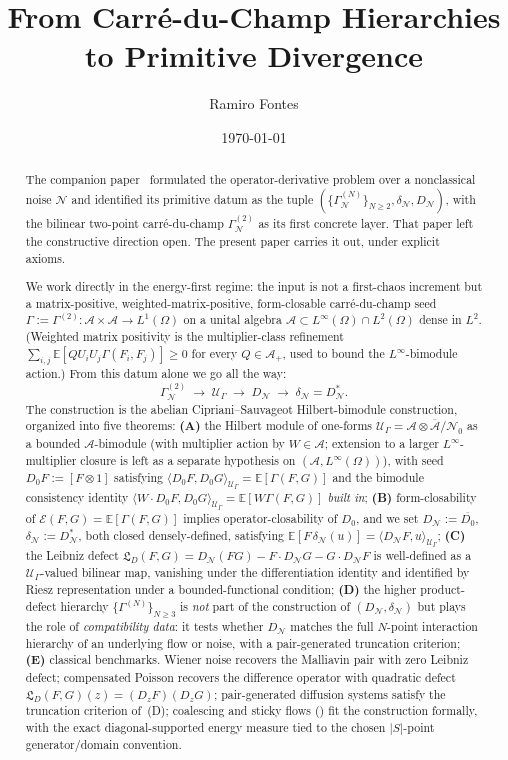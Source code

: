 \documentclass[11pt,reqno]{amsart}
\title{From Carr\'e-du-Champ Hierarchies to Primitive Divergence}
\author{Ramiro Fontes}
\date{\today}
\theoremstyle{plain}
\theoremstyle{definition}
\theoremstyle{remark}
\newcommand{\E}{\mathbb{E}}
\newcommand{\cA}{\mathcal A}
\newcommand{\cE}{\mathcal E}
\newcommand{\cN}{\mathcal N}
\newcommand{\cU}{\mathcal U}
\newcommand{\dN}{D_{\cN}}
\newcommand{\divN}{\delta_{\cN}}
\newcommand{\Lleib}{\mathfrak L}
\begin{document}
\begin{abstract}
The companion paper~\cite{PrimitiveDivergence} formulated the
operator-derivative problem over a nonclassical noise $\cN$ and
identified its primitive datum as the tuple
$(\{\Gamma_{\cN}^{(N)}\}_{N\ge 2},\divN,\dN)$, with the bilinear
two-point carr\'e-du-champ $\Gamma_{\cN}^{(2)}$ as its first concrete
layer. That paper left the constructive direction open. The present
paper carries it out, under explicit axioms.

We work directly in the energy-first regime: the input is not
a first-chaos increment but a matrix-positive, weighted-matrix-positive,
form-closable carr\'e-du-champ seed
$\Gamma:=\Gamma^{(2)}\colon\cA\times\cA\to L^{1}(\Omega)$ on a
unital algebra $\cA\subset L^{\infty}(\Omega)\cap L^{2}(\Omega)$
dense in $L^{2}$. (Weighted matrix positivity is the
multiplier-class refinement
$\sum_{i,j}\E[Q U_{i}U_{j}\Gamma(F_{i},F_{j})]\ge 0$ for every
$Q\in\cA_{+}$, used to bound the $L^{\infty}$-bimodule action.)
From this datum alone we go all the way:
\[
  \Gamma^{(2)}_{\cN}
  \;\longrightarrow\;
  \cU_{\Gamma}
  \;\longrightarrow\;
  \dN
  \;\longrightarrow\;
  \divN=\dN^{*}.
\]
The construction is the abelian Cipriani--Sauvageot
Hilbert-bimodule construction, organized into five theorems:
\textbf{(A)} the Hilbert module of one-forms
$\cU_{\Gamma}=\overline{\cA\otimes\cA/\mathcal N_{0}}$ as a
bounded $\cA$-bimodule (with multiplier action by $W\in\cA$;
extension to a larger $L^{\infty}$-multiplier closure is left
as a separate hypothesis on $(\cA,L^{\infty}(\Omega))$), with
seed $D_{0}F:=[F\otimes 1]$ satisfying
$\langle D_{0}F,D_{0}G\rangle_{\cU_{\Gamma}}=\E[\Gamma(F,G)]$
and the bimodule consistency identity
$\langle W\!\cdot\! D_{0}F,D_{0}G\rangle_{\cU_{\Gamma}}=\E[W\Gamma(F,G)]$
\emph{built in};
\textbf{(B)} form-closability of $\cE(F,G)=\E[\Gamma(F,G)]$
implies operator-closability of $D_{0}$, and we set
$\dN:=\overline{D_{0}}$, $\divN:=\dN^{*}$, both closed
densely-defined, satisfying
$\E[F\,\divN(u)]=\langle\dN F,u\rangle_{\cU_{\Gamma}}$;
\textbf{(C)} the Leibniz defect
$\Lleib_{D}(F,G)=\dN(FG)-F\!\cdot\!\dN G-G\!\cdot\!\dN F$ is
well-defined as a $\cU_{\Gamma}$-valued bilinear map, vanishing
under the differentiation identity and identified by Riesz
representation under a bounded-functional condition;
\textbf{(D)} the higher product-defect hierarchy
$\{\Gamma^{(N)}\}_{N\ge 3}$ is \emph{not} part of the
construction of $(\dN,\divN)$ but plays the role of
\emph{compatibility data}: it tests whether $\dN$ matches the
full $N$-point interaction hierarchy of an underlying flow or
noise, with a pair-generated truncation criterion;
\textbf{(E)} classical benchmarks. Wiener noise recovers the
Malliavin pair with zero Leibniz defect; compensated Poisson
recovers the difference operator with quadratic defect
$\Lleib_{D}(F,G)(z)=(D_{z}F)(D_{z}G)$; pair-generated diffusion
systems satisfy the truncation criterion of~(D); coalescing and
sticky flows (\cite{LeJanRaimond2004}) fit the construction
formally, with the exact diagonal-supported energy measure tied to
the chosen $|S|$-point generator/domain convention.


\end{abstract}
\end{document}
